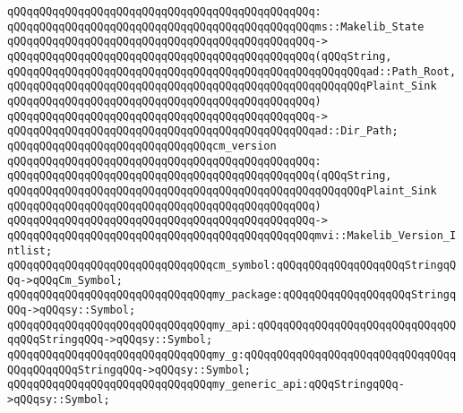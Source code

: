 \verb|qQQqqQQqqQQqqQQqqQQqqQQqqQQqqQQqqQQqqQQqqQQqqQQq:|\newline
\verb|qQQqqQQqqQQqqQQqqQQqqQQqqQQqqQQqqQQqqQQqqQQqqQQqms::Makelib_State|\newline
\verb|qQQqqQQqqQQqqQQqqQQqqQQqqQQqqQQqqQQqqQQqqQQqqQQq->|\newline
\verb|qQQqqQQqqQQqqQQqqQQqqQQqqQQqqQQqqQQqqQQqqQQqqQQq(qQQqString,|\newline
\verb|qQQqqQQqqQQqqQQqqQQqqQQqqQQqqQQqqQQqqQQqqQQqqQQqqQQqqQQqad::Path_Root,|\newline
\verb|qQQqqQQqqQQqqQQqqQQqqQQqqQQqqQQqqQQqqQQqqQQqqQQqqQQqqQQqPlaint_Sink|\newline
\verb|qQQqqQQqqQQqqQQqqQQqqQQqqQQqqQQqqQQqqQQqqQQqqQQq)|\newline
\verb|qQQqqQQqqQQqqQQqqQQqqQQqqQQqqQQqqQQqqQQqqQQqqQQq->|\newline
\verb|qQQqqQQqqQQqqQQqqQQqqQQqqQQqqQQqqQQqqQQqqQQqqQQqad::Dir_Path;|\newline
\newline
\verb|qQQqqQQqqQQqqQQqqQQqqQQqqQQqqQQqcm_version|\newline
\verb|qQQqqQQqqQQqqQQqqQQqqQQqqQQqqQQqqQQqqQQqqQQqqQQq:|\newline
\verb|qQQqqQQqqQQqqQQqqQQqqQQqqQQqqQQqqQQqqQQqqQQqqQQq(qQQqString,|\newline
\verb|qQQqqQQqqQQqqQQqqQQqqQQqqQQqqQQqqQQqqQQqqQQqqQQqqQQqqQQqPlaint_Sink|\newline
\verb|qQQqqQQqqQQqqQQqqQQqqQQqqQQqqQQqqQQqqQQqqQQqqQQq)|\newline
\verb|qQQqqQQqqQQqqQQqqQQqqQQqqQQqqQQqqQQqqQQqqQQqqQQq->|\newline
\verb|qQQqqQQqqQQqqQQqqQQqqQQqqQQqqQQqqQQqqQQqqQQqqQQqmvi::Makelib_Version_Intlist;|\newline
\newline
\verb|qQQqqQQqqQQqqQQqqQQqqQQqqQQqqQQqcm_symbol:qQQqqQQqqQQqqQQqqQQqStringqQQq->qQQqCm_Symbol;|\newline
\newline
\verb|qQQqqQQqqQQqqQQqqQQqqQQqqQQqqQQqmy_package:qQQqqQQqqQQqqQQqqQQqStringqQQq->qQQqsy::Symbol;|\newline
\verb|qQQqqQQqqQQqqQQqqQQqqQQqqQQqqQQqmy_api:qQQqqQQqqQQqqQQqqQQqqQQqqQQqqQQqqQQqStringqQQq->qQQqsy::Symbol;|\newline
\verb|qQQqqQQqqQQqqQQqqQQqqQQqqQQqqQQqmy_g:qQQqqQQqqQQqqQQqqQQqqQQqqQQqqQQqqQQqqQQqqQQqStringqQQq->qQQqsy::Symbol;|\newline
\verb|qQQqqQQqqQQqqQQqqQQqqQQqqQQqqQQqmy_generic_api:qQQqStringqQQq->qQQqsy::Symbol;|\newline
